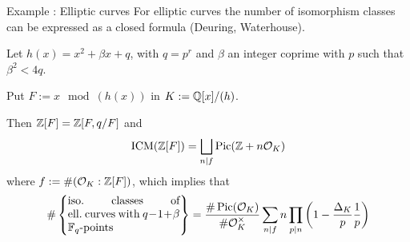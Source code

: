 \documentclass[handout]{beamer}
\begin{document}
\begin{frame}{ Example : Elliptic curves }
 For elliptic curves the number of isomorphism classes can be expressed as a closed formula (Deuring, Waterhouse).
 
 Let $h(x)=x^2+\beta x +q$, with $q=p^r$ and $\beta$ an integer coprime with $p$ such that $\beta^2<4q$.
 
 Put $F:=x \mod (h(x))$ in $K:=\mathbb{Q}[x]/(h)$.
 
 Then $\mathbb{Z}[F]=\mathbb{Z}[F,q/F]$ and
 \[\operatorname{ICM}(\mathbb{Z}[F]) = \bigsqcup_{n|f} \operatorname{Pic}(\mathbb{Z}+n{\mathcal O}_K) \]
 where $f:=\#({\mathcal O}_K:\mathbb{Z}[F])$, which implies that
 \[
 \#\set{\parbox[p]{10em}{ iso.~classes of ell.~curves with $q-1+\beta$ $\F_q$-points }} =
 \dfrac{\#\Pic(\cO_K)}{\#\cO_K^\times} \sum_{n|f} n\prod_{p|n}\left( 1-\dfrac{\Delta_K}{p}\dfrac{1}{p} \right) \]
\end{frame}
\end{document}

